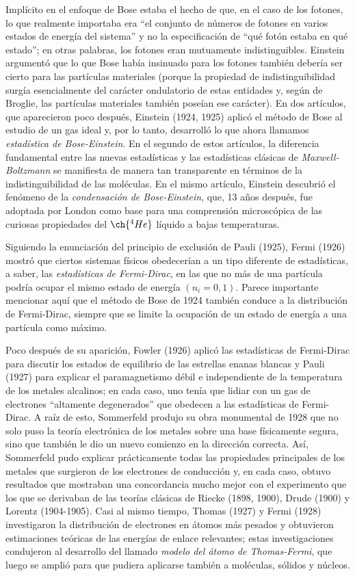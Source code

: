 Implícito en el enfoque de Bose estaba el hecho de que, en el caso de los fotones, lo que realmente importaba era \enquote{el conjunto de números de fotones en varios estados de energía del sistema} y no la especificación de \enquote{qué fotón estaba en qué estado}; en otras palabras, los fotones eran mutuamente indistinguibles. Einstein argumentó que lo que Bose había insinuado para los fotones también debería ser cierto para las partículas materiales (porque la propiedad de indistinguibilidad surgía esencialmente del carácter ondulatorio de estas entidades y, según de Broglie, las partículas materiales también poseían ese carácter). En dos artículos, que aparecieron poco después, Einstein (1924, 1925) aplicó el método de Bose al estudio de un gas ideal y, por lo tanto, desarrolló lo que ahora llamamos \emph{estadística de Bose-Einstein}. En el segundo de estos artículos, la diferencia fundamental entre las nuevas estadísticas y las estadísticas clásicas de \emph{Maxwell-Boltzmann} se manifiesta de manera tan transparente en términos de la indistinguibilidad de las moléculas. En el mismo artículo, Einstein descubrió el fenómeno de la \emph{condensación de Bose-Einstein}, que, 13 años después, fue adoptada por London como base para una comprensión microscópica de las curiosas propiedades del $\ch{^4 He}$ líquido a bajas temperaturas.
\par
Siguiendo la enunciación del principio de exclusión de Pauli (1925), Fermi (1926) mostró que ciertos sistemas físicos obedecerían a un tipo diferente de estadísticas, a saber, las \emph{estadísticas de Fermi-Dirac}, en las que no más de una partícula podría ocupar el mismo estado de energía $(n_{i} = 0, 1)$. Parece importante mencionar aquí que el método de Bose de 1924 también conduce a la distribución de Fermi-Dirac, siempre que se limite la ocupación de un estado de energía a una partícula como máximo.
\par
Poco después de su aparición, Fowler (1926) aplicó las estadísticas de Fermi-Dirac para discutir los estados de equilibrio de las estrellas enanas blancas y Pauli (1927) para explicar el paramagnetismo débil e independiente de la temperatura de los metales alcalinos; en cada caso, uno tenía que lidiar con un gas de electrones \enquote{altamente degenerados} que obedecen a las estadísticas de Fermi-Dirac. A raíz de esto, Sommerfeld produjo su obra monumental de 1928 que no solo puso la teoría electrónica de los metales sobre una base físicamente segura, sino que también le dio un nuevo comienzo en la dirección correcta. Así, Sommerfeld pudo explicar prácticamente todas las propiedades principales de los metales que surgieron de los electrones de conducción y, en cada caso, obtuvo resultados que mostraban una concordancia mucho mejor con el experimento que los que se derivaban de las teorías clásicas de Riecke (1898, 1900), Drude (1900) y Lorentz (1904-1905). Casi al mismo tiempo, Thomas (1927) y Fermi (1928) investigaron la distribución de electrones en átomos más pesados y obtuvieron estimaciones teóricas de las energías de enlace relevantes; estas investigaciones condujeron al desarrollo del llamado \emph{modelo del átomo de Thomas-Fermi}, que luego se amplió para que pudiera aplicarse también a moléculas, sólidos y núcleos.
